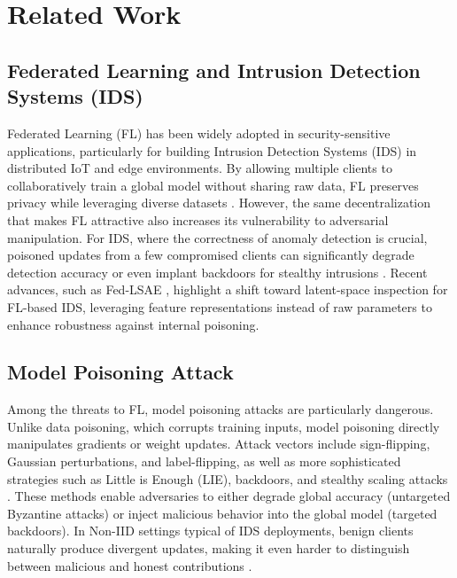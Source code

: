 \section{Related Work} \label{sect_relatedworks}

\subsection{Federated Learning and Intrusion Detection Systems (IDS)}
Federated Learning (FL) has been widely adopted in security-sensitive applications, particularly for building Intrusion Detection Systems (IDS) in distributed IoT and edge environments. By allowing multiple clients to collaboratively train a global model without sharing raw data, FL preserves privacy while leveraging diverse datasets \cite{kairouz2021advances,Nguyen2022}. However, the same decentralization that makes FL attractive also increases its vulnerability to adversarial manipulation. For IDS, where the correctness of anomaly detection is crucial, poisoned updates from a few compromised clients can significantly degrade detection accuracy or even implant backdoors for stealthy intrusions \cite{Liu2020}. Recent advances, such as Fed-LSAE \cite{FedLSAE}, highlight a shift toward latent-space inspection for FL-based IDS, leveraging feature representations instead of raw parameters to enhance robustness against internal poisoning.


\subsection{Model Poisoning Attack}
Among the threats to FL, model poisoning attacks are particularly dangerous. Unlike data poisoning, which corrupts training inputs, model poisoning directly manipulates gradients or weight updates. Attack vectors include sign-flipping, Gaussian perturbations, and label-flipping, as well as more sophisticated strategies such as Little is Enough (LIE), backdoors, and stealthy scaling attacks \cite{fang2020local,Bhagoji2019,baruch2019}. These methods enable adversaries to either degrade global accuracy (untargeted Byzantine attacks) or inject malicious behavior into the global model (targeted backdoors). In Non-IID settings typical of IDS deployments, benign clients naturally produce divergent updates, making it even harder to distinguish between malicious and honest contributions \cite{Shejwalkar2021}.



